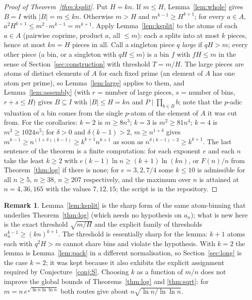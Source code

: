 \documentclass[11pt]{article}
\theoremstyle{definition}
\newtheorem{remark}[theorem]{Remark}
\begin{document}
\begin{proof}[Proof of Theorem~\ref{thm:ksplit}]
Put $H=kn$. If $m\le H$, Lemma~\ref{lem:whole} gives $B=I$ with $|B|=m\le kn$. Otherwise $m>H$ and
$m^{k-1}\ge H^{k+1}$; for every $a\in A$, $a^2H^{k+1}\le m^2\cdot m^{k-1}=m^{k+1}$. Apply Lemma~\ref{lem:ksplit} to
the atoms of each $a\in A$ (pairwise coprime, product $a$, all $\le m$): each $a$ splits into at most $k$ pieces, hence
at most $kn=H$ pieces in all. Call a singleton piece $q$ \emph{large} if $qH>m$; every other piece (a bin, or a
singleton with $qH\le m$) is a bin $f$ with $fH\le m$ in the sense of Section~\ref{sec:construction} with threshold
$T=m/H$. The large pieces are atoms of distinct elements of $A$ for each fixed prime (an element of $A$ has one atom
per prime), so Lemma~\ref{lem:large} applies to them, and Lemma~\ref{lem:assembly} (with $r$ = number of large pieces,
$s$ = number of bins, $r+s\le H$) gives $B\subseteq I$ with $|B|\le H=kn$ and $P\mid\prod_{b\in B}b$; note that the
$p$-adic valuation of a bin comes from the single $p$-atom of the element of $A$ it was cut from.
For the corollaries: $k=2$ is $m\ge 8n^3$; $k=3$ is $m^2\ge 81n^4$; $k=4$ is $m^3\ge 1024n^5$; for $\delta>0$ and
$\delta(k-1)>2$, $m\ge n^{1+\delta}$ gives $m^{k-1}\ge n^{(1+\delta)(k-1)}\ge k^{k+1}n^{k+1}$ as soon as
$n^{\delta(k-1)-2}\ge k^{k+1}$. The last sentence of the theorem is a finite computation: for each exponent $e$ and each
$n$ take the least $k\ge 2$ with $e(k-1)\ln n\ge(k+1)\ln(kn)$, or $F(n)/n$ from Theorem~\ref{thm:log} if there is
none; for $e=3,2,7/4$ some $k\le 10$ is admissible for all $n\ge 5$, $n\ge 38$, $n\ge 207$ respectively, and
the maximum over $n$ is attained at $n=4,36,165$ with the values $7,12,15$; the script is in the repository.
\end{proof}

\begin{remark}
Lemma~\ref{lem:ksplit} is the sharp form of the same atom-binning that underlies Theorem~\ref{thm:log} (which needs no
hypothesis on $a_n$); what is new here is the exact threshold $\sqrt{m/H}$ and the explicit family of thresholds
$a_n^{k-1}\ge(kn)^{k+1}$. The threshold is essentially sharp for the lemma: $k+1$ atoms each with $q^2H>m$ cannot share
bins and violate the hypothesis. With $k=2$ the lemma is Lemma~\ref{lem:pack} in a different normalisation, so
Section~\ref{sec:long} is the case $k=2$; it was kept because it also exhibits the explicit assignment required by
Conjecture~\ref{conj:S}. Choosing $k$ as a function of $m/n$ does not improve the global bounds of
Theorems~\ref{thm:log} and \ref{thm:sqrt}: for $m=n\,e^{\sqrt{\ln n\ln\ln n}}$ both routes give about
$n\sqrt{\ln n/\ln\ln n}$.
\end{remark}
\end{document}
